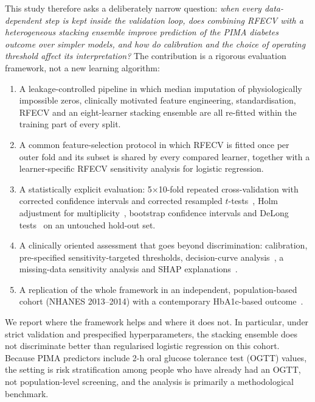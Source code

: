\documentclass[preprint,12pt,authoryear=false]{elsarticle}
\begin{document}
This study therefore asks a deliberately narrow question: \emph{when every data-dependent step is kept inside the validation loop, does combining RFECV with a heterogeneous stacking ensemble improve prediction of the PIMA diabetes outcome over simpler models, and how do calibration and the choice of operating threshold affect its interpretation?} The contribution is a rigorous evaluation framework, not a new learning algorithm:

\begin{enumerate}
  \item A leakage-controlled pipeline in which median imputation of physiologically impossible zeros, clinically motivated feature engineering, standardisation, RFECV and an eight-learner stacking ensemble are all re-fitted within the training part of every split.
  \item A common feature-selection protocol in which RFECV is fitted once per outer fold and its subset is shared by every compared learner, together with a learner-specific RFECV sensitivity analysis for logistic regression.
  \item A statistically explicit evaluation: 5$\times$10-fold repeated cross-validation with corrected confidence intervals and corrected resampled $t$-tests~\cite{nadeau2003inference,bouckaert2004replicability}, Holm adjustment for multiplicity~\cite{holm1979}, bootstrap confidence intervals and DeLong tests~\cite{delong1988,sun2014delong} on an untouched hold-out set.
  \item A clinically oriented assessment that goes beyond discrimination: calibration, pre-specified sensitivity-targeted thresholds, decision-curve analysis~\cite{vickers2006dca}, a missing-data sensitivity analysis and SHAP explanations~\cite{lundberg2017shap}.
  \item A replication of the whole framework in an independent, population-based cohort (NHANES 2013--2014) with a contemporary HbA1c-based outcome~\cite{nhanes2013}.
\end{enumerate}

We report where the framework helps and where it does not. In particular, under strict validation and prespecified hyperparameters, the stacking ensemble does not discriminate better than regularised logistic regression on this cohort. Because PIMA predictors include 2-h oral glucose tolerance test (OGTT) values, the setting is risk stratification among people who have already had an OGTT, not population-level screening, and the analysis is primarily a methodological benchmark.
\end{document}
